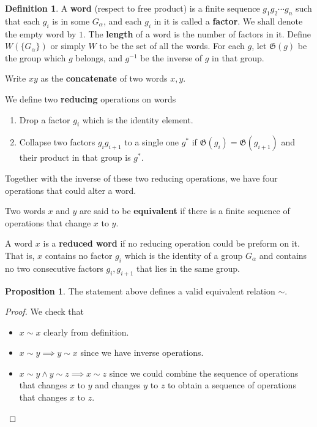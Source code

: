 \documentclass[a4paper,titlepage]{article}
\theoremstyle{remark}
\theoremstyle{definition}
\newtheorem{definition}{Definition}
\theoremstyle{theorem}
\newtheorem{proposition}{Proposition}
\newcommand{\gid}{\mathfrak{G}}
\begin{document}
  \begin{definition}
    A {\bf word} (respect to free product) is a finite sequence $g_1 g_2 \cdots g_n$ such that
    each $g_i$ is in some $G_\alpha$, and each $g_i$ in it is called a {\bf factor}.
    We shall denote the empty word by $1$. The {\bf length}
    of a word is the number of factors in it. Define $W(\{G_\alpha\})$ or simply $W$ 
    to be the set of all the words. For each $g$, let $\gid(g)$ be the group which $g$ belongs, 
    and $g^{-1}$ be the inverse of $g$ in that group.

    Write $xy$ as the {\bf concatenate} of two words $x, y$.

    We define two {\bf reducing} operations on words
    \begin{enumerate}
      \item Drop a factor $g_i$ which is the identity element.
      \item Collapse two factors $g_i g_{i+1}$ to a single one $g^*$ if $\gid(g_i) = \gid(g_{i+1})$
        and their product in that group is $g^*$.
    \end{enumerate}
    Together with the inverse of these two reducing operations, we have four operations
    that could alter a word.

    Two words $x$ and $y$ are said to be {\bf equivalent} if there is a finite sequence of 
    operations that change $x$ to $y$.

    A word $x$ is a {\bf reduced word} if no reducing operation could be preform on it. That is,
    $x$ contains no factor $g_i$ which is the identity of a group $G_\alpha$ and contains no
    two consecutive factors $g_i, g_{i+1}$ that lies in the same group.
  \end{definition}
  \begin{proposition}
    The statement above defines a valid equivalent relation $\sim$.
  \end{proposition}
  \begin{proof}
    We check that
    \begin{itemize}
      \item $x \sim x$ clearly from definition.
      \item $x \sim y \implies y \sim x$ since we have inverse operations.
      \item $x \sim y \land y \sim z \implies x \sim z$ since we could combine the sequence 
        of operations that changes $x$ to $y$ and changes $y$ to $z$ to obtain a sequence 
        of operations that changes $x$ to $z$.
    \end{itemize}
  \end{proof}
\end{document}
